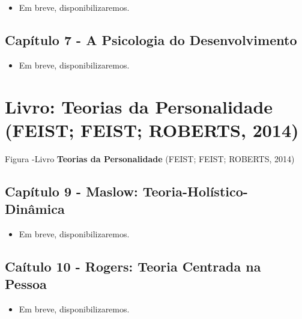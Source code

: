 \documentclass[
]{book}
\providecommand{\tightlist}{%
  \setlength{\itemsep}{0pt}\setlength{\parskip}{0pt}}
\begin{document}
\begin{itemize}
\tightlist
\item
  Em breve, disponibilizaremos.
\end{itemize}

\hypertarget{capuxedtulo-7---a-psicologia-do-desenvolvimento}{%
\subsection{Capítulo 7 - A Psicologia do Desenvolvimento}\label{capuxedtulo-7---a-psicologia-do-desenvolvimento}}

\begin{itemize}
\tightlist
\item
  Em breve, disponibilizaremos.
\end{itemize}

\hypertarget{livro-teorias-da-personalidade-feist-feist-roberts-2014}{%
\section{\texorpdfstring{Livro: \textbf{Teorias da Personalidade} (FEIST; FEIST; ROBERTS, 2014)}{Livro: Teorias da Personalidade (FEIST; FEIST; ROBERTS, 2014)}}\label{livro-teorias-da-personalidade-feist-feist-roberts-2014}}

Figura -Livro \textbf{Teorias da Personalidade} (FEIST; FEIST; ROBERTS, 2014)

\hypertarget{capuxedtulo-9---maslow-teoria-holuxedstico-dinuxe2mica}{%
\subsection{Capítulo 9 - Maslow: Teoria-Holístico-Dinâmica}\label{capuxedtulo-9---maslow-teoria-holuxedstico-dinuxe2mica}}

\begin{itemize}
\tightlist
\item
  Em breve, disponibilizaremos.
\end{itemize}

\hypertarget{cauxedtulo-10---rogers-teoria-centrada-na-pessoa}{%
\subsection{Caítulo 10 - Rogers: Teoria Centrada na Pessoa}\label{cauxedtulo-10---rogers-teoria-centrada-na-pessoa}}

\begin{itemize}
\tightlist
\item
  Em breve, disponibilizaremos.
\end{itemize}
\end{document}
